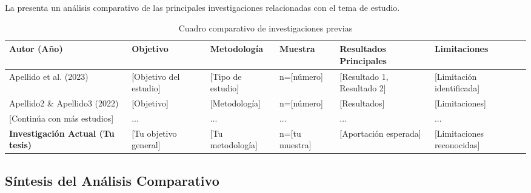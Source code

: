 
La  presenta un análisis comparativo de las principales investigaciones relacionadas con el tema de estudio.

\begin{table}[htbp]
    \centering
    \caption{Cuadro comparativo de investigaciones previas}
    \label{tab:comparativa_investigaciones}
    \small
    \begin{tabular}{@{}p{2cm}p{2.5cm}p{2cm}p{1.5cm}p{3cm}p{2cm}@{}}
        \toprule
        \textbf{Autor (Año)} & \textbf{Objetivo} & \textbf{Metodología} & \textbf{Muestra} & \textbf{Resultados Principales} & \textbf{Limitaciones} \\
        \midrule
        
        Apellido et al. (2023) & 
        [Objetivo del estudio] & 
        [Tipo de estudio] & 
        n=[número] & 
        [Resultado 1, Resultado 2] & 
        [Limitación identificada] \\
        
        \midrule
        
        Apellido2 \& Apellido3 (2022) & 
        [Objetivo] & 
        [Metodología] & 
        n=[número] & 
        [Resultados] & 
        [Limitaciones] \\
        
        \midrule
        
        [Continúa con más estudios] &
        ... &
        ... &
        ... &
        ... &
        ... \\
        
        \midrule
        
        \textbf{Investigación Actual (Tu tesis)} & 
        [Tu objetivo general] & 
        [Tu metodología] & 
        n=[tu muestra] & 
        [Aportación esperada] & 
        [Limitaciones reconocidas] \\
        
        \bottomrule
    \end{tabular}
\end{table}

\subsection{Síntesis del Análisis Comparativo}
\label{subsec:sintesis_comparativa}

